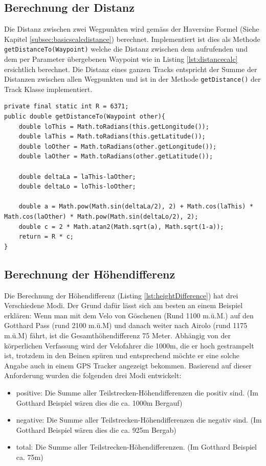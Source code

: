 \subsection{Berechnung der Distanz}
\label{subsec:distance}
Die Distanz zwischen zwei Wegpunkten wird gemäss der Haversine Formel (Siehe Kapitel \ref{subsec:basicscalcdistance}) berechnet. Implementiert ist dies als Methode \lstinline$getDistanceTo(Waypoint)$ welche die Distanz zwischen dem aufrufenden und dem per Parameter übergebenen Waypoint wie in Listing \ref{lst:distancecalc} ersichtlich berechnet. Die Distanz eines ganzen Tracks entspricht der Summe der Distanzen zwischen allen Wegpunkten und ist in der Methode \lstinline$getDistance()$ der Track Klasse implementiert.

\begin{lstlisting}[caption={Distanzberechnung}, label={lst:distancecalc}]
private final static int R = 6371;
public double getDistanceTo(Waypoint other){
	double loThis = Math.toRadians(this.getLongitude());
	double laThis = Math.toRadians(this.getLatitude());
	double loOther = Math.toRadians(other.getLongitude());
	double laOther = Math.toRadians(other.getLatitude());
	
	double deltaLa = laThis-laOther;
	double deltaLo = loThis-loOther;
	
	double a = Math.pow(Math.sin(deltaLa/2), 2) + Math.cos(laThis) * Math.cos(laOther) * Math.pow(Math.sin(deltaLo/2), 2);
	double c = 2 * Math.atan2(Math.sqrt(a), Math.sqrt(1-a));
	return = R * c;
}
\end{lstlisting}

\subsection{Berechnung der Höhendifferenz}
\label{subsec:heightdifference}
Die Berechnung der Höhendifferenz (Listing \ref{lst:heightDifference}) hat drei Verschiedene Modi. Der Grund dafür lässt sich am besten an einem Beispiel erklären: Wenn man mit dem Velo von Göschenen (Rund 1100 m.ü.M.) auf den Gotthard Pass (rund 2100 m.ü.M) und danach weiter nach Airolo (rund 1175 m.ü.M) fährt, ist die Gesamthöhendifferenz 75 Meter. Abhängig von der körperlichen Verfassung wird der Velofahrer die 1000m, die er hoch gestrampelt ist, trotzdem in den Beinen spüren und entsprechend möchte er eine solche Angabe auch in einem GPS Tracker angezeigt bekommen. Basierend auf dieser Anforderung wurden die folgenden drei Modi entwickelt:

\begin{itemize}
\item positive: Die Summe aller Teilstrecken-Höhendifferenzen die positiv sind. (Im Gotthard Beispiel wären dies die ca. 1000m Bergauf)
\item negative: Die Summe aller Teilstrecken-Höhendifferenzen die negativ sind. (Im Gotthard Beispiel wären dies die ca. 925m Bergab)
\item total: Die Summe aller Teilstrecken-Höhendifferenzen. (Im Gotthard Beispiel ca. 75m)
\end{itemize}

